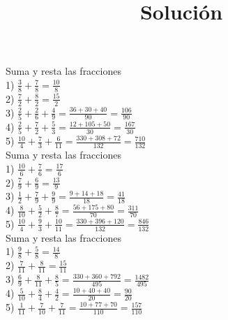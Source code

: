 \documentclass[a4paper,12pt]{article}
\title{Solución}
\author{}
\date{}
\begin{document}
\maketitle
 Suma  y resta las fracciones\vspace{1cm}\\ 
1) $\frac{3}{8}+\frac{7}{8}=\frac{10}{8}$\vspace{1cm}\\ 
2) $\frac{7}{2}+\frac{8}{2}=\frac{15}{2}$\vspace{1cm}\\ 
3) $\frac{2}{5}+\frac{2}{6}+\frac{4}{9}  =\frac{36+30+40}{90}= \frac{106}{90}  $\vspace{1cm}\\ 
4) $\frac{2}{5}+\frac{7}{2}+\frac{5}{3}  =\frac{12+105+50}{30}= \frac{167}{30}  $\vspace{1cm}\\ 
5) $\frac{10}{4}+\frac{7}{3}+\frac{6}{11}  =\frac{330+308+72}{132}= \frac{710}{132}  $\vspace{1cm}\\ 

 \pagebreak 
 Suma  y resta las fracciones\vspace{1cm}\\ 
1) $\frac{10}{6}+\frac{7}{6}=\frac{17}{6}$\vspace{1cm}\\ 
2) $\frac{7}{9}+\frac{6}{9}=\frac{13}{9}$\vspace{1cm}\\ 
3) $\frac{1}{2}+\frac{7}{9}+\frac{9}{9}  =\frac{9+14+18}{18}= \frac{41}{18}  $\vspace{1cm}\\ 
4) $\frac{8}{10}+\frac{5}{2}+\frac{8}{7}  =\frac{56+175+80}{70}= \frac{311}{70}  $\vspace{1cm}\\ 
5) $\frac{10}{4}+\frac{9}{3}+\frac{10}{11}  =\frac{330+396+120}{132}= \frac{846}{132}  $\vspace{1cm}\\ 

 \pagebreak 
 Suma  y resta las fracciones\vspace{1cm}\\ 
1) $\frac{9}{8}+\frac{5}{8}=\frac{14}{8}$\vspace{1cm}\\ 
2) $\frac{7}{11}+\frac{8}{11}=\frac{15}{11}$\vspace{1cm}\\ 
3) $\frac{6}{9}+\frac{8}{11}+\frac{8}{5}  =\frac{330+360+792}{495}= \frac{1482}{495}  $\vspace{1cm}\\ 
4) $\frac{5}{10}+\frac{8}{4}+\frac{4}{2}  =\frac{10+40+40}{20}= \frac{90}{20}  $\vspace{1cm}\\ 
5) $\frac{1}{11}+\frac{7}{10}+\frac{7}{11}  =\frac{10+77+70}{110}= \frac{157}{110}  $\vspace{1cm}\\ 
\end{document}
